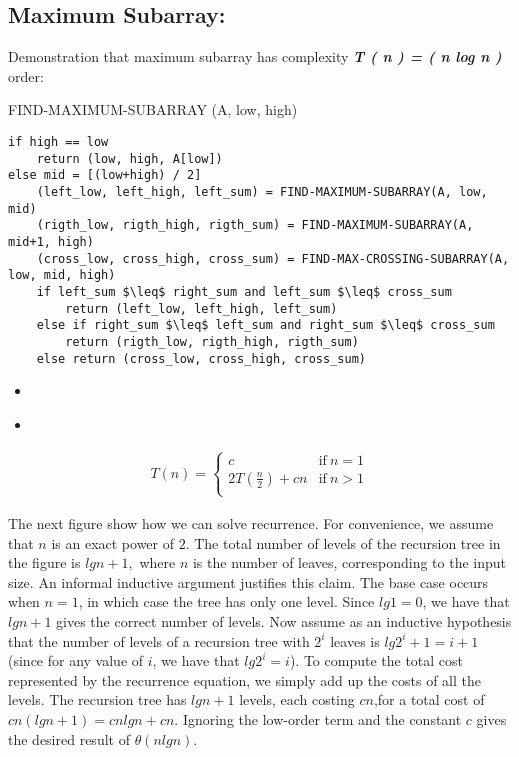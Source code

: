 \subsection{Maximum Subarray:}

Demonstration that maximum subarray has complexity {\bfseries\itshape T ( n ) = ( n log n ) } order:  \hfill \break

{\bfseries\color{Violet}{function}} FIND-MAXIMUM-SUBARRAY (A, low, high)
\begin{lstlisting}[mathescape=true]
if high == low
	return (low, high, A[low])
else mid = [(low+high) / 2]
	(left_low, left_high, left_sum) = FIND-MAXIMUM-SUBARRAY(A, low, mid)
	(rigth_low, rigth_high, rigth_sum) = FIND-MAXIMUM-SUBARRAY(A, mid+1, high)
	(cross_low, cross_high, cross_sum) = FIND-MAX-CROSSING-SUBARRAY(A, low, mid, high)
	if left_sum $\leq$ right_sum and left_sum $\leq$ cross_sum
		return (left_low, left_high, left_sum)
	else if right_sum $\leq$ left_sum and right_sum $\leq$ cross_sum
		return (rigth_low, rigth_high, rigth_sum)
	else return (cross_low, cross_high, cross_sum)
\end{lstlisting} \hfill

\begin{itemize}
\item {\bfseries\itshape\color{Maroon}{Demonstration:}} 
\end{itemize} 

\begin{itemize}
\item {\bfseries\itshape\color{Violet}{First, our recurrence equations are:}}
\end{itemize} \hfill

\begin{ceqn}
\begin{align}
T( n ) = \left\{
\begin{array}{ll}
c & \mathrm {if\ } n = 1 \\
2T ( \frac{n}{2} ) + cn & \mathrm {if\ } n > 1 \\
\end{array}
\right.
\end{align}
\end{ceqn} \hfill

The next figure show how we can solve recurrence. For convenience, we assume that $n$ is an exact power of $2$.
The total number of levels of the recursion tree in the figure is $lg n + 1,$ where $n$ is the number of leaves, corresponding to the input size. An informal inductive argument justifies this claim. The base case occurs when $n = 1$, in which case the tree has only one level. Since $lg 1 = 0$, we have that $lg n + 1$ gives the correct number of levels. Now assume as an inductive hypothesis that the number of levels
of a recursion tree with $2^{i}$ leaves is $lg 2^{i} + 1 =  i + 1$ (since for any value of $i$, we have that $lg 2^{i} = i$). \hfill \break
To compute the total cost represented by the recurrence equation, we simply add up the costs of all the levels. The recursion tree has $lg n + 1$ levels, each costing $cn$,for a total cost of $cn(lg n + 1) = cn lg n + cn$. Ignoring the low-order term and the constant $c$ gives the desired result of $ \theta(n lg n)$.

